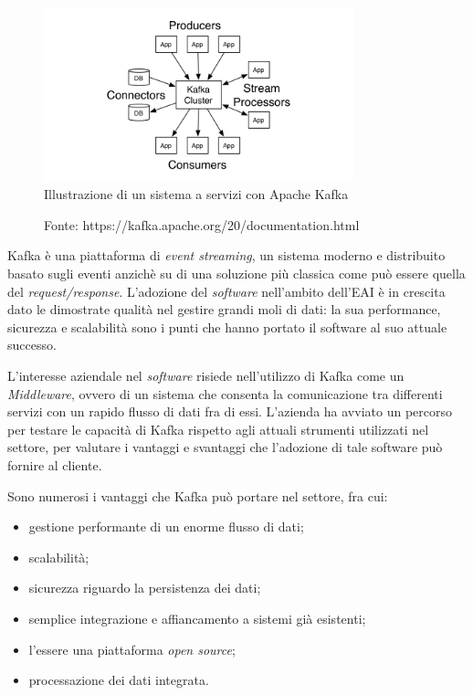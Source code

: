 \bigskip
\begin{figure}[h]
  \begin{center}
    \includegraphics[width=0.8\textwidth]{images/kafka.png}\\
    \caption{Illustrazione di un sistema a servizi con Apache Kafka}
    \captionsetup{aboveskip=2pt,font=it}
    \caption*{Fonte: https://kafka.apache.org/20/documentation.html}
  \end{center}
\end{figure}

Kafka è una piattaforma di \textit{event streaming}, un sistema moderno e distribuito basato sugli eventi anzichè su di una soluzione più classica come può essere quella del \textit{request/response}.
L'adozione del \textit{software} nell'ambito dell'EAI è in crescita dato le dimostrate qualità nel gestire grandi moli di dati: la sua performance, sicurezza e scalabilità sono i punti che hanno portato il software al suo attuale successo.

L'interesse aziendale nel \textit{software} risiede nell'utilizzo di Kafka come un  \textit{Middleware}, ovvero di un sistema che consenta la comunicazione tra differenti servizi con un rapido flusso di dati fra di essi.
L'azienda ha avviato un percorso per testare le capacità di Kafka rispetto agli attuali strumenti utilizzati nel settore, per valutare i vantaggi e svantaggi che l'adozione di tale software può fornire al cliente.

\bigskip\noindent
Sono numerosi i vantaggi che Kafka può portare nel settore, fra cui:
\begin{itemize}
  \item gestione performante di un enorme flusso di dati;
  \item scalabilità;
  \item sicurezza riguardo la persistenza dei dati;
  \item semplice integrazione e affiancamento a sistemi già esistenti;
  \item l'essere una piattaforma \textit{open source};
  \item processazione dei dati integrata.
\end{itemize}


